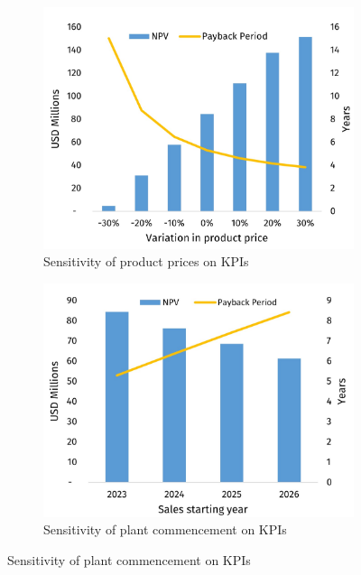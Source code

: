 \begin{figure}[h]
\begin{subfigure}[b]{.40\linewidth}
\end{subfigure}
\begin{subfigure}[b]{.40\linewidth}
\includegraphics[width=\linewidth]{chapters/6-economics/figures/Sensitivity_ProductPrice.jpg}
\caption{Sensitivity of product prices on KPIs}\label{Sensitivity_ProductPrice}
\end{subfigure}
\begin{subfigure}[b]{.40\linewidth}
\includegraphics[width=\linewidth]{chapters/6-economics/figures/Sensitivity_ProductionDelay.jpg}
\caption{Sensitivity of plant commencement on KPIs}\label{Sensitivity_ProductionDelay}
\end{subfigure}


\end{figure}
